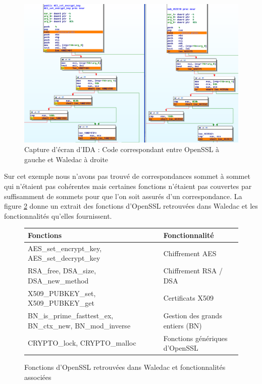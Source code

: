 \begin{figure}[h]
\begin{center}
\includegraphics[width=1.0\textwidth]{supports/libs/WalSSLIDAAESgraph.png}
\caption{Capture d'écran d'IDA : Code correspondant entre OpenSSL à gauche et Waledac à droite} 
\label{fig:plugin_code_sync}
\end{center}
\end{figure}

Sur cet exemple nous n'avons pas trouvé de correspondances sommet à sommet qui n'étaient pas cohérentes mais certaines fonctions n'étaient pas couvertes par suffisamment de sommets pour que l'on soit assurés d'un correspondance.
La figure \ref{fig:tab_fonctionnalites_waledac_openssl} donne un extrait des fonctions d'OpenSSL retrouvées dans Waledac et les fonctionnalités qu'elles fournissent.

\begin{figure}[h]
\begin{tabular}{|p{9cm}|l|}
\hline
Fonctions 							& Fonctionnalité 			\\
\hline
AES\_set\_encrypt\_key, AES\_set\_decrypt\_key 			& Chiffrement AES 			\\
RSA\_free, DSA\_size, DSA\_new\_method 				& Chiffrement RSA / DSA 		\\
 X509\_PUBKEY\_set, X509\_PUBKEY\_get 				& Certificats X509 			\\
BN\_is\_prime\_fasttest\_ex, BN\_ctx\_new, BN\_mod\_inverse	& Gestion des grands entiers (BN)	\\
CRYPTO\_lock, CRYPTO\_malloc 					& Fonctions génériques d'OpenSSL 	\\
\hline
\end{tabular}
\caption{Fonctions d'OpenSSL retrouvées dans Waledac et fonctionnalités associées}
\label{fig:tab_fonctionnalites_waledac_openssl}
\end{figure}

